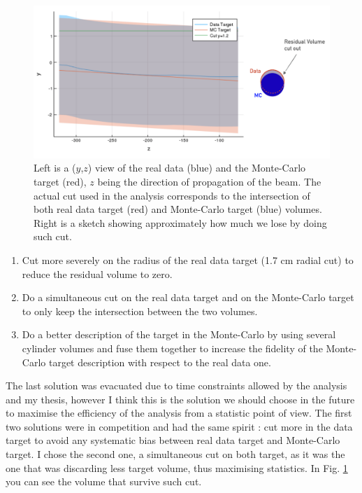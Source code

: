 \begin{figure}[!h]
	\includegraphics[scale=0.4]{./gfx/Targetcut.png}
	\caption{Left is a ($y$,$z$) view of the real data (blue) and the Monte-Carlo target (red), $z$ being the direction of propagation of the beam. The actual cut used in the analysis corresponds to the intersection of both real data target (red) and Monte-Carlo target (blue) volumes. Right is a sketch showing approximately how much we lose by doing such cut.}
	\label{pic:Target}
\end{figure}

\begin{enumerate}
  \item Cut more severely on the radius of the real data target (1.7 cm radial cut) to reduce the  residual volume to zero.
  \item Do a simultaneous cut on the real data target and on the Monte-Carlo target to only keep the intersection between the two volumes.
  \item Do a better description of the target in the Monte-Carlo by using several cylinder volumes and fuse them together to increase the fidelity of the Monte-Carlo target description with respect to the real data one.
\end{enumerate}

The last solution was evacuated due to time constraints allowed by the analysis and my thesis, however I think this is the solution we should choose in the future to maximise the efficiency of the analysis from a statistic point of view.
The first two solutions were in competition and had the same spirit : cut more in the data target to avoid any systematic bias between real data target and Monte-Carlo target. I chose the second one, a simultaneous cut on both target, as it was the one that was discarding less target volume, thus maximising statistics. In Fig. \ref{pic:Target} you can see the volume that survive such cut.

